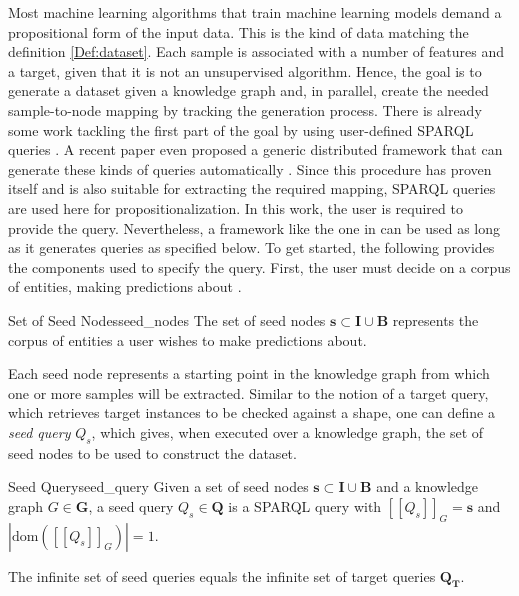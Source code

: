
    Most machine learning algorithms that train machine learning models demand a propositional form of the input data. This is the kind of data matching the definition \ref{Def:dataset}. Each sample is associated with a number of features and a target, given that it is not an unsupervised algorithm. Hence, the goal is to generate a dataset given a knowledge graph and, in parallel, create the needed sample-to-node mapping by tracking the generation process. There is already some work tackling the first part of the goal by using user-defined SPARQL queries \cite{cheng2011automated,narasimha2011liddm}. A recent paper even proposed a generic distributed framework that can generate these kinds of queries automatically \cite{moghaddam2021literal2feature}. Since this procedure has proven itself and is also suitable for extracting the required mapping, SPARQL queries are used here for propositionalization. In this work, the user is required to provide the query. Nevertheless, a framework like the one in \cite{moghaddam2021literal2feature} can be used as long as it generates queries as specified below. To get started, the following provides the components used to specify the query. 
    First, the user must decide on a corpus of entities, making predictions about \cite{cheng2011automated}. 
    \begin{Def}{Set of Seed Nodes}{seed_nodes}
        The set of seed nodes $\mathbf{s} \subset \mathbf{I} \cup \mathbf{B}$ represents the corpus of entities a user wishes to make predictions about. 
    \end{Def}
    
    Each seed node represents a starting point in the knowledge graph from which one or more samples will be extracted. Similar to the notion of a target query, which retrieves target instances to be checked against a shape, one can define a \emph{seed query} $Q_s$, which gives, when executed over a knowledge graph, the set of seed nodes to be used to construct the dataset.

    \begin{Def}{Seed Query}{seed_query}
    Given a set of seed nodes $\mathbf{s} \subset \mathbf{I} \cup \mathbf{B}$ and a knowledge graph $G \in \mathbf{G}$, a seed query $Q_s \in \mathbf{Q}$ is a SPARQL query with $[[Q_s]]_G = \mathbf{s}$ and $|\text{dom}([[Q_s]]_G)| = 1$.
    \end{Def}
    
    The infinite set of seed queries equals the infinite set of target queries $\mathbf{Q_T}$. 
    
